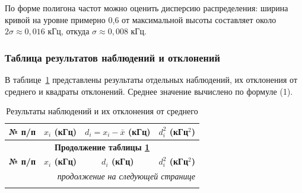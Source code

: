По форме полигона частот можно оценить дисперсию распределения: ширина кривой на уровне примерно 0,6 от максимальной высоты составляет около $2\sigma \approx 0,016$ кГц, откуда $\sigma \approx 0,008$ кГц.

\subsubsection{Таблица результатов наблюдений и отклонений}

В таблице~\ref{tab:measurements} представлены результаты отдельных наблюдений, их отклонения от среднего и квадраты отклонений. Среднее значение вычислено по формуле (1).

\begin{longtable}{|c|c|c|c|}
\caption{Результаты наблюдений и их отклонения от среднего} \label{tab:measurements} \\
\hline
\textbf{№ п/п} & \textbf{$x_i$ (кГц)} & \textbf{$d_i = x_i - \bar{x}$ (кГц)} & \textbf{$d_i^2$ (кГц$^2$)} \\
\hline
\endfirsthead

\hline
\multicolumn{4}{|c|}{\textbf{Продолжение таблицы \ref{tab:measurements}}} \\
\hline
\textbf{№ п/п} & \textbf{$x_i$ (кГц)} & \textbf{$d_i$ (кГц)} & \textbf{$d_i^2$ (кГц$^2$)} \\
\hline
\endhead

\hline
\multicolumn{4}{|r|}{\textit{продолжение на следующей странице}} \\
\endfoot

\hline
\endlastfoot


\end{longtable}

